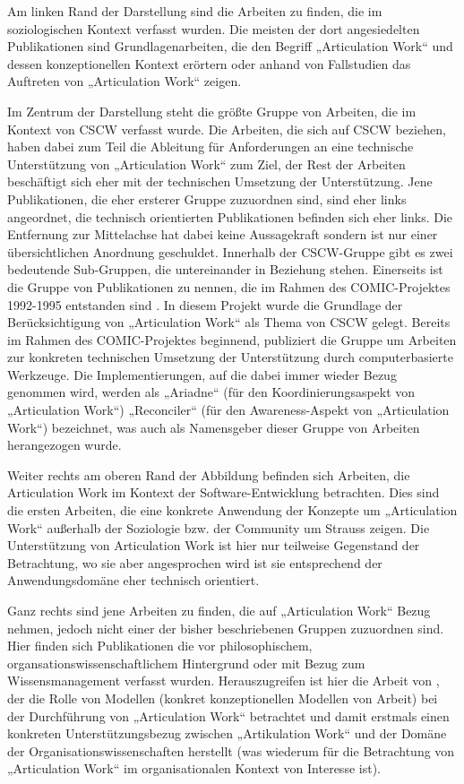 Am linken Rand der Darstellung sind die Arbeiten zu finden, die im soziologischen Kontext verfasst wurden. Die meisten der dort angesiedelten Publikationen sind Grundlagenarbeiten, die den Begriff „Articulation Work“ und dessen konzeptionellen Kontext erörtern oder anhand von Fallstudien das Auftreten von „Articulation Work“ zeigen.

Im Zentrum der Darstellung steht die größte Gruppe von Arbeiten, die im Kontext von \gls{CSCW} verfasst wurde. Die Arbeiten, die sich auf \gls{CSCW} beziehen, haben dabei zum Teil die Ableitung für Anforderungen an eine technische Unterstützung von „Articulation Work“ zum Ziel, der Rest der Arbeiten beschäftigt sich eher mit der technischen Umsetzung der Unterstützung. Jene Publikationen, die eher ersterer Gruppe zuzuordnen sind, sind eher links angeordnet, die technisch orientierten Publikationen befinden sich eher links. Die Entfernung zur Mittelachse hat dabei keine Aussagekraft sondern ist nur einer übersichtlichen Anordnung geschuldet. Innerhalb der \gls{CSCW}-Gruppe gibt es zwei bedeutende Sub-Gruppen, die untereinander in Beziehung stehen. Einerseits ist die Gruppe von Publikationen zu nennen, die im Rahmen des COMIC-Projektes 1992-1995 entstanden sind \citep{Rodden95}. In diesem Projekt wurde die Grundlage der Berücksichtigung von „Articulation Work“ als Thema von \gls{CSCW} gelegt. Bereits im Rahmen des COMIC-Projektes beginnend, publiziert die Gruppe um \citeauthor{Simone00} Arbeiten zur konkreten technischen Umsetzung der Unterstützung durch computerbasierte Werkzeuge. Die Implementierungen, auf die dabei immer wieder Bezug genommen wird, werden als „Ariadne“ (für den Koordinierungsaspekt von „Articulation Work“) „Reconciler“ (für den Awareness-Aspekt von „Articulation Work“) bezeichnet, was auch als Namensgeber dieser Gruppe von Arbeiten herangezogen wurde.

Weiter rechts am oberen Rand der Abbildung befinden sich Arbeiten, die Articulation Work im Kontext der Software-Entwicklung betrachten. Dies sind die ersten Arbeiten, die eine konkrete Anwendung der Konzepte um „Articulation Work“ außerhalb der Soziologie bzw. der Community um Strauss zeigen. Die Unterstützung von Articulation Work ist hier nur teilweise Gegenstand der Betrachtung, wo sie aber angesprochen wird ist sie entsprechend der Anwendungsdomäne eher technisch orientiert.

Ganz rechts sind jene Arbeiten zu finden, die auf „Articulation Work“ Bezug nehmen, jedoch nicht einer der bisher beschriebenen Gruppen zuzuordnen sind. Hier finden sich Publikationen die vor philosophischem, organsationswissenschaftlichem Hintergrund oder mit Bezug zum Wissensmanagement verfasst wurden. Herauszugreifen ist hier die Arbeit von \citet{Jorgensen04}, der die Rolle von Modellen (konkret konzeptionellen Modellen von Arbeit) bei der Durchführung von „Articulation Work“ betrachtet und damit erstmals einen konkreten Unterstützungsbezug zwischen „Artikulation Work“ und der Domäne der Organisationswissenschaften herstellt (was wiederum für die Betrachtung von „Articulation Work“ im organisationalen Kontext von Interesse ist).

